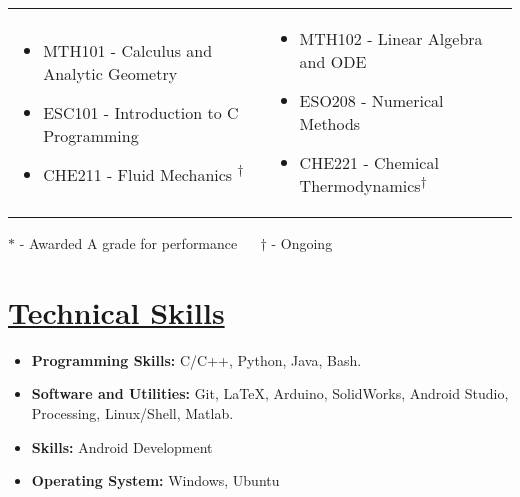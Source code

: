 \documentclass{article}
\begin{document}
\begin{center}
\begin{tabular}{m{7.5cm}  m{7.5cm}}
 \begin{itemize}
\item MTH101 - Calculus and Analytic Geometry
\item ESC101 - Introduction to C Programming
\item CHE211 - Fluid Mechanics \textsuperscript{$\dagger$}
\end{itemize}
&
\begin{itemize}
\item MTH102 - Linear Algebra and ODE
\item ESO208 - Numerical Methods
\item CHE221 - Chemical Thermodynamics\textsuperscript{$\dagger$}
\end{itemize}
\end{tabular}

\begin{flushright}
    \small{$\ast$ - Awarded A grade for performance}
    $\quad$
    \small{$\dagger$ - Ongoing}
\end{flushright}
\end{center}


\section*{\underline{Technical Skills}}
\begin{itemize}
\item \textbf{Programming Skills: } C/C++, Python, Java, Bash. 
\item \textbf{Software and Utilities: } Git, \LaTeX, Arduino, SolidWorks, Android Studio, Processing, Linux/Shell, Matlab.
\item \textbf{Skills: } Android Development
\item \textbf{Operating System: } Windows, Ubuntu  
\end{itemize}
\end{document}
